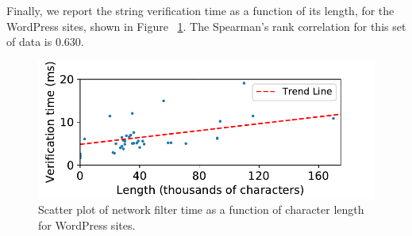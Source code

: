 Finally, we report the string verification time as a function of its length, for the WordPress sites, shown in Figure ~\ref{fig:verification_time_string_length_wordpress}. The Spearman's rank correlation for this set of data is 0.630. 


\begin{figure}[h]
	\includegraphics[scale=0.55]{results/string_length_vs_verification_time_wordpress_small.pdf}
	\caption{Scatter plot of network filter time as a function of character length for WordPress sites.}
	\label{fig:verification_time_string_length_wordpress}
\end{figure}
